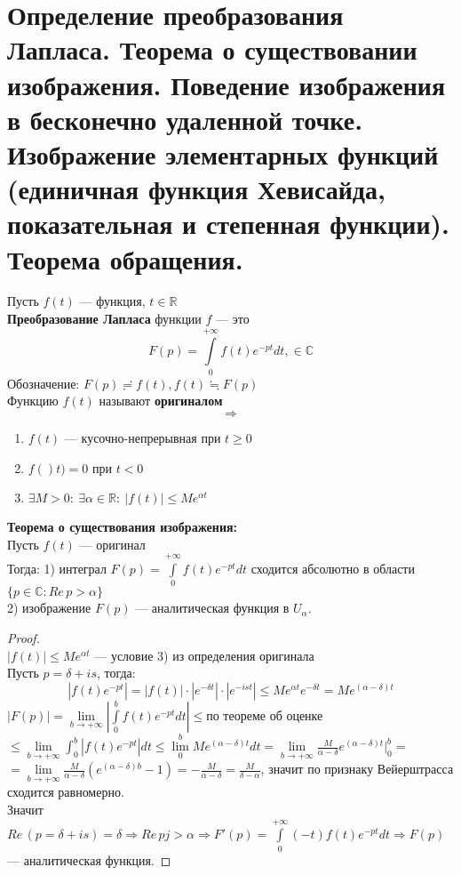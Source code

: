 \newpage
\section{Определение преобразования Лапласа. Теорема о существовании изображения. Поведение изображения в бесконечно удаленной точке. Изображение элементарных функций (единичная функция Хевисайда, показательная и степенная функции). Теорема обращения.}


Пусть $f(t)$ --- функция, $t \in \mathbb{R}$\\
\textbf{Преобразование Лапласа} функции $f$ --- это $$F(p)=\int\limits_{0}^{+\infty}f(t)e^{-pt}dt, \in \mathbb{C}$$
Обозначение: $F(p)\risingdotseq f(t), f(t)\fallingdotseq F(p)$\\[2mm]
Функцию $f(t)$ называют \textbf{оригиналом}
$$\Rightarrow$$
\begin{enumerate}
    \item $f(t)$ --- кусочно-непрерывная при $t\geq 0$
    \item $f()t)=0$ при $t<0$
    \item $\exists M > 0: \ \exists \alpha \in \mathbb{R}: \ |f(t)|\leq M e^{\alpha t}$
\end{enumerate}


\textbf{Теорема о существования изображения:}\\[2mm]
Пусть $f(t)$ --- оригинал\\
Тогда: 1) интеграл $F(p)=\int\limits_{0}^{+\infty} f(t)e^{-pt}dt$ сходится абсолютно в области $\{p\in\mathbb{C}: Re\,p>\alpha\}$\\
2) изображение $F(p)$ --- аналитическая функция в $U_{\alpha}$.

\begin{proof}
    \ \\
    $|f(t)|\leq M e^{\alpha t}$ --- условие 3) из определения оригинала\\
    Пусть $p=\delta +i s$, тогда:
    $$|f(t)e^{-pt}|=|f(t)|\cdot|e^{-\delta t}|\cdot |e^{-ist}|\leq M e^{\alpha t}e^{-\delta t}=Me^{(\alpha-\delta)t}$$
    $|F(p)|=\lim\limits_{b\to + \infty} \left| \int\limits_{0}^{b}f(t)e^{-pt}dt \right| \leq \text{по теореме об оценке}$\\
    $\leq \lim\limits_{b\to +\infty}\int_{0}^{b}|f(t)e^{-pt}|dt \leq \lim\limits_0^bMe^{(\alpha-\delta)t}dt = \lim\limits_{b\to +\infty}\frac{M}{\alpha-\delta}e^{(\alpha -\delta)t}|_0^b=$\\
    $=\lim\limits_{b\to +\infty}\frac{M}{\alpha-\delta}(e^{(\alpha-\delta)b}-1)=-\frac{M}{\alpha-\delta}=\frac{M}{\delta-\alpha}$, значит по признаку Вейерштрасса сходится равномерно.\\
    Значит $Re\,(p=\delta+i s)=\delta \Rightarrow Re \, pj>\alpha \Rightarrow F'(p)=\int\limits_0^{+\infty} (-t)f(t)e^{-pt}dt \Rightarrow F(p)$ --- аналитическая функция.  
\end{proof}

